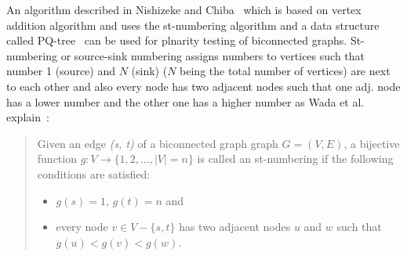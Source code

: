 An algorithm described in Nishizeke and Chiba~\autocite{nishizeki2008planar} which is based on vertex addition 
algorithm and uses the st-numbering algorithm and a data structure 
called PQ-tree~\autocite[33]{nishizeki2008planar} can be used for plnarity testing of biconnected graphs. 
St-numbering or source-sink numbering assigns numbers to vertices such that number 1 (source) and $ N $ (sink) 
($ N $ being the total number of vertices) are next to each other and also every node has two adjacent nodes 
such that one adj. node has a lower number and the other one has a higher number 
as Wada et al. explain~\autocite[357]{wada1997Biconnected}:

\begin{quote}
  Given an edge \textit{(s, t)} of a biconnected graph graph $ G = (V, E) $, a bijective function $ g: V \rightarrow \{ 1, 2, ..., |V|=n \} $ is called an st-numbering if the following conditions are satisfied:

  \begin{itemize}
  \item $ g(s) = 1 $, $ g(t) = n $ and
    \item every node $ v \in V - \{ s, t \} $ has two adjacent nodes $ u $ and $ w $ such that $ g(u) < g(v) < g(w) $.
  \end{itemize}
\end{quote}




\sloppy
\printbibliography


